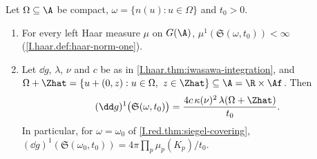 Let $\Omega\subseteq\A$ be compact, $\omega=\{n(u):u\in\Omega\}$ and $t_0>0$.
\begin{enumerate}
  \item[(a)] For every left Haar measure $\mu$ on $G(\A)$, $\mu^1(\mathfrak S(\omega,t_0))<\infty$
  (\cref{I.haar.def:haar-norm-one}).
  \item[(b)] Let $\dd g$, $\lambda$, $\nu$ and $c$ be as in \cref{I.haar.thm:iwasawa-integration}, and
  $\Omega+\Zhat=\{u+(0,z):u\in\Omega,\ z\in\Zhat\}\subseteq\A=\R\times\Af$. Then
  \[
    (\dd g)^1\bigl(\mathfrak S(\omega,t_0)\bigr)=\frac{4c\,\kappa(\nu)^2\,\lambda(\Omega+\Zhat)}{t_0}.
  \]
  In particular, for $\omega=\omega_0$ of \cref{I.red.thm:siegel-covering},
  $(\dd g)^1(\mathfrak S(\omega_0,t_0))=4\pi\prod_p\mu_p(K_p)/t_0$.
\end{enumerate}
